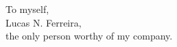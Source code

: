 \null\vfil
{\large
\begin{center}
To myself,\\\vspace{12pt}
Lucas N. Ferreira,\\\vspace{12pt}
the only person worthy of my company.
\end{center}}
\vfil\null

